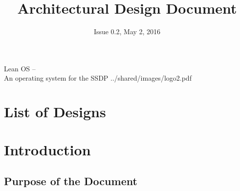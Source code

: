 

\title{Architectural Design Document}
\def \documentid {LEANOS-UVIE-ADD-001}
\date{Issue 0.2, May 2, 2016}

\newcommand\affil[1]{\textsuperscript#1}

\def\preparedby {Armin Luntzer\affil{1}}
\def\checkedby {Roland Ottensamer\affil{1}}
\def\approvedby {Franz Kerschbaum\affil{1}}

\def\affiliations{
	\affil{1} Department of Astrophysics, University of Vienna
}






\usepackage{vhistory}

\usepackage{biblatex}







\rereadauxdesignlabels





\setmainfont{MyriadPro-SemiCondensed}
\uvietitlepage%
{Lean OS --\\ An operating system for the SSDP}%
{\doctitle}%
{../shared/images/logo2.pdf}
\setmainfont{MyriadPro}

\approvalpage

\tableofcontents
\newpage


\chapter*{List of Designs}
\the\designlist


\begin{versionhistory}
\end{versionhistory}


\chapter{Introduction}

\section{Purpose of the Document}

